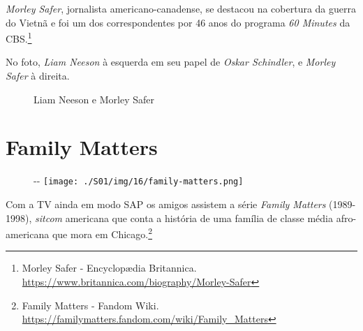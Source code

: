 \saveparinfos
\noindent
\begin{minipage}[c]{0.45\textwidth}\useparinfo

\emph{Morley Safer}, jornalista americano-canadense, se destacou na
cobertura da guerra do Vietnã e foi um dos correspondentes por 46 anos
do programa \emph{60 Minutes} da CBS.\footnote{\sloppy Morley Safer - Encyclopædia Britannica. \url{https://www.britannica.com/biography/Morley-Safer}}

No foto, \emph{Liam Neeson} à esquerda em seu papel de \emph{Oskar
Schindler}, e \emph{Morley Safer} à direita.

\end{minipage}\hfill
\begin{minipage}[c]{0.5\textwidth}

\begin{figure}
  \centering
    \caption{Liam Neeson e Morley Safer\label{fig:liam-neeson-e-morley-safer}}
\end{figure}

\end{minipage}

\hypertarget{family-matters}{%
\section{Family Matters}\label{family-matters}}

\begin{figure}[!ht]
  \begin{adjustwidth}{-\oddsidemargin-1in}{-\rightmargin}
    \centering
    \texttt{[image: ./S01/img/16/family-matters.png]}
  \end{adjustwidth}
\end{figure}

Com a TV ainda em modo SAP os amigos assistem a série \emph{Family
Matters} (1989-1998), \emph{sitcom} americana que conta a história de
uma família de classe média afro-americana que mora em
Chicago.\footnote{\sloppy Family Matters - Fandom Wiki. \url{https://familymatters.fandom.com/wiki/Family_Matters}}

